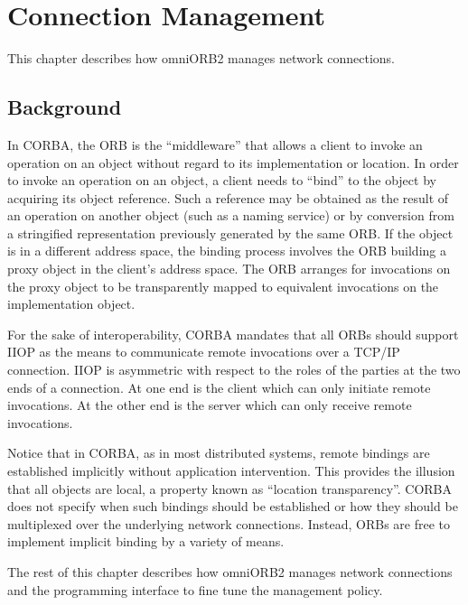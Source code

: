 \documentclass[11pt,twoside,onecolumn]{book}
\begin{document}
\chapter{Connection Management}
\label{ch_conn}


This chapter describes how omniORB2 manages network connections.

\section{Background}

In CORBA, the ORB is the ``middleware'' that allows a client to invoke an
operation on an object without regard to its implementation or location. In
order to invoke an operation on an object, a client needs to ``bind'' to
the object by acquiring its object reference. Such a reference may be
obtained as the result of an operation on another object (such as a naming
service) or by conversion from a stringified representation previously
generated by the same ORB. If the object is in a different address space,
the binding process involves the ORB building a proxy object in the
client's address space. The ORB arranges for invocations on the proxy
object to be transparently mapped to equivalent invocations on the
implementation object.

For the sake of interoperability, CORBA mandates that all ORBs should
support IIOP as the means to communicate remote invocations over a TCP/IP
connection. IIOP is asymmetric with respect to the roles of the parties at
the two ends of a connection. At one end is the client which can only
initiate remote invocations. At the other end is the server which can only
receive remote invocations.

Notice that in CORBA, as in most distributed systems, remote bindings are
established implicitly without application intervention. This provides the
illusion that all objects are local, a property known as ``location
transparency''. CORBA does not specify when such bindings should be
established or how they should be multiplexed over the underlying network
connections. Instead, ORBs are free to implement implicit binding by a
variety of means. 

The rest of this chapter describes how omniORB2 manages network
connections and the programming interface to fine tune the management
policy. 
\end{document}
